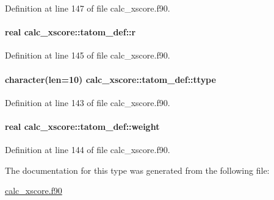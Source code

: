 Definition at line 147 of file calc\-\_\-xscore.\-f90.

\hypertarget{structcalc__xscore_1_1tatom__def_ac8d8103fcfce5294796cc371fdb79f98}{
\paragraph[{r}]{\setlength{\rightskip}{0pt plus 5cm}real calc\-\_\-xscore\-::tatom\-\_\-def\-::r}}\label{structcalc__xscore_1_1tatom__def_ac8d8103fcfce5294796cc371fdb79f98}


Definition at line 145 of file calc\-\_\-xscore.\-f90.

\hypertarget{structcalc__xscore_1_1tatom__def_a2388c46a21d0c30719887a56a2ca521b}{
\paragraph[{ttype}]{\setlength{\rightskip}{0pt plus 5cm}character(len=10) calc\-\_\-xscore\-::tatom\-\_\-def\-::ttype}}\label{structcalc__xscore_1_1tatom__def_a2388c46a21d0c30719887a56a2ca521b}


Definition at line 143 of file calc\-\_\-xscore.\-f90.

\hypertarget{structcalc__xscore_1_1tatom__def_ad48563cb8c90dd67cbdeb3b0abafa100}{
\paragraph[{weight}]{\setlength{\rightskip}{0pt plus 5cm}real calc\-\_\-xscore\-::tatom\-\_\-def\-::weight}}\label{structcalc__xscore_1_1tatom__def_ad48563cb8c90dd67cbdeb3b0abafa100}


Definition at line 144 of file calc\-\_\-xscore.\-f90.



The documentation for this type was generated from the following file\-:\begin{DoxyCompactItemize}
\item 
\hyperlink{calc__xscore_8f90}{calc\-\_\-xscore.\-f90}\end{DoxyCompactItemize}
